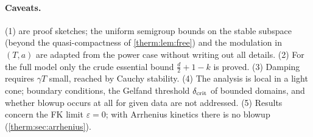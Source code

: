 \paragraph{Caveats.}  (1)  are proof
sketches; the uniform semigroup bounds on the stable subspace (beyond the
quasi-compactness of \cref{therm:lem:free}) and the modulation in $(T,a)$ are
adapted from the power case without writing out all details.
(2) For the full model only the crude essential bound $\frac d2+1-k$ is proved.
(3) Damping requires $\gamma T$ small, reached by Cauchy stability.  (4) The
analysis is local in a light cone; boundary conditions, the Gelfand threshold
$\delta_{\rm crit}$ of bounded domains, and whether blowup occurs at all for given
data are not addressed.  (5) Results concern the FK limit $\varepsilon=0$;
with Arrhenius kinetics there is no blowup (\cref{therm:sec:arrhenius}).
